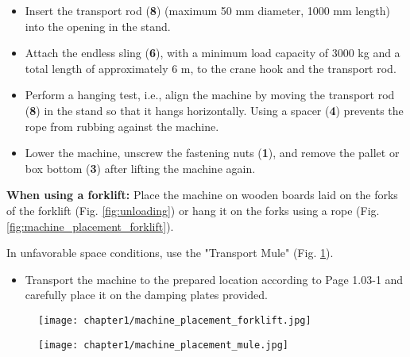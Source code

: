 
\begin{itemize}
    \item Insert the transport rod (\textbf{8}) (maximum 50 mm diameter, 1000 mm length) into the opening in the stand.
    \item Attach the endless sling (\textbf{6}), with a minimum load capacity of 3000 kg and a total length of approximately 6 m, to the crane hook and the transport rod.
\end{itemize}



\begin{itemize}
    \item Perform a hanging test, i.e., align the machine by moving the transport rod (\textbf{8}) in the stand so that it hangs horizontally. Using a spacer (\textbf{4}) prevents the rope from rubbing against the machine.
    
    \item Lower the machine, unscrew the fastening nuts (\textbf{1}), and remove the pallet or box bottom (\textbf{3}) after lifting the machine again.
\end{itemize}

\noindent\textbf{When using a forklift:} Place the machine on wooden boards laid on the forks of the forklift (Fig. \ref{fig:unloading}) or hang it on the forks using a rope (Fig. \ref{fig:machine_placement_forklift}).
    
\vspace{1em} %

\noindent In unfavorable space conditions, use the "Transport Mule" (Fig. \ref{fig:machine_placement_mule}).

\begin{itemize}
    \item Transport the machine to the prepared location according to Page 1.03-1 and carefully place it on the damping plates provided.
\end{itemize}

\begin{figure}[h]
\centering
\begin{minipage}[t]{0.45\textwidth}
    \centering
    \texttt{[image: chapter1/machine\_placement\_forklift.jpg]} %
    \caption{}
    \label{fig:machine_placement_forklift}
\end{minipage}
\hfill
\begin{minipage}[t]{0.45\textwidth}
    \centering
    \texttt{[image: chapter1/machine\_placement\_mule.jpg]} %
    \caption{}
    \label{fig:machine_placement_mule}
\end{minipage}
\end{figure}

